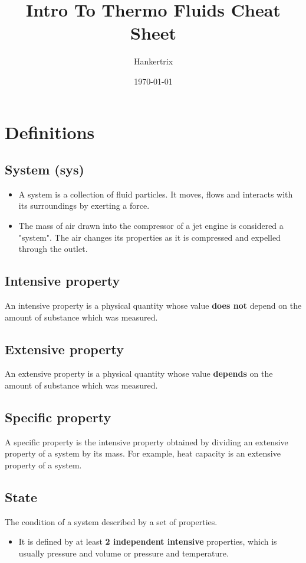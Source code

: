 \documentclass[11pt]{article}
\author{Hankertrix}
\date{\today}
\title{Intro To Thermo Fluids Cheat Sheet}
\begin{document}
\maketitle
\setcounter{tocdepth}{2}
\tableofcontents \clearpage
\section{Definitions}
\label{sec:org3d0dee1}

\subsection{System (sys)}
\label{sec:org9bfcd73}
\begin{itemize}
\item A system is a collection of fluid particles. It moves, flows and interacts with its surroundings by exerting a force.
\item The mass of air drawn into the compressor of a jet engine is considered a "system". The air changes its properties as it is compressed and expelled through the outlet.
\end{itemize}

\subsection{Intensive property}
\label{sec:org6ac7d14}
An intensive property is a physical quantity whose value \textbf{does not} depend on the amount of substance which was measured.

\subsection{Extensive property}
\label{sec:org470cdf7}
An extensive property is a physical quantity whose value \textbf{depends} on the amount of substance which was measured.

\subsection{Specific property}
\label{sec:orgbed7e7b}
A specific property is the intensive property obtained by dividing an extensive property of a system by its mass. For example, heat capacity is an extensive property of a system.

\subsection{State}
\label{sec:org3525031}
The condition of a system described by a set of properties.
\begin{itemize}
\item It is defined by at least \textbf{2 independent intensive} properties, which is usually pressure and volume or pressure and temperature.
\end{itemize}
\end{document}
